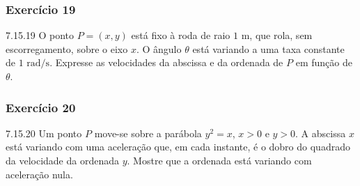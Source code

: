 \subsubsection*{Exercício 19}
\begin{exercicio}[19]{7.15.19}
O ponto $P = (x, y)$ está fixo à roda de raio $1\text{ m}$, que rola, sem escorregamento, sobre o eixo $x$. O ângulo $\theta$ está variando a uma taxa constante de $1\text{ rad/s}$. Expresse as velocidades da abscissa e da ordenada de $P$ em função de $\theta$.
\begin{center}
\end{center}
\end{exercicio}

\subsubsection*{Exercício 20}
\begin{exercicio}[20]{7.15.20}
Um ponto $P$ move-se sobre a parábola $y^2 = x$, $x > 0$ e $y > 0$. A abscissa $x$ está variando com uma aceleração que, em cada instante, é o dobro do quadrado da velocidade da ordenada $y$. Mostre que a ordenada está variando com aceleração nula.
\end{exercicio}

